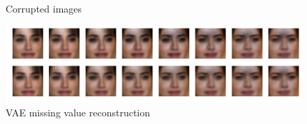 \documentclass{article}
\begin{document}
\begin{figure}%
\centering
{}
\qquad
{}
\caption{Corrupted images}
\end{figure}

\begin{center}
\begin{figure}
    \includegraphics[width=\linewidth]{report/vae_missing_3.png}
    \caption{VAE missing value reconstruction}
\end{figure}
\end{center}
\end{document}
